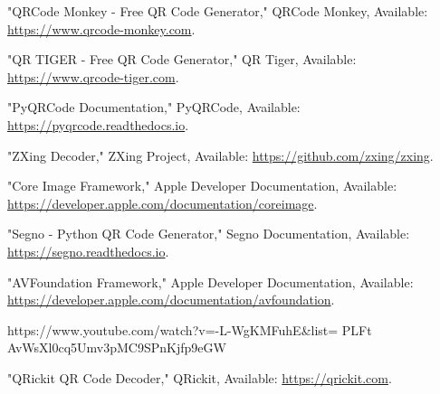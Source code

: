 \begin{thebibliography}{9}
	 "QRCode Monkey - Free QR Code Generator," QRCode Monkey, Available: \url{https://www.qrcode-monkey.com}.
	
	 "QR TIGER - Free QR Code Generator," QR Tiger, Available: \url{https://www.qrcode-tiger.com}.
	
	
	 "PyQRCode Documentation," PyQRCode, Available: \url{https://pyqrcode.readthedocs.io}.

	 "ZXing Decoder," ZXing Project, Available: \url{https://github.com/zxing/zxing}.

	 "Core Image Framework," Apple Developer Documentation, Available: \url{https://developer.apple.com/documentation/coreimage}.

	 "Segno - Python QR Code Generator," Segno Documentation, Available: \url{https://segno.readthedocs.io}.

	 "AVFoundation Framework," Apple Developer Documentation, Available: \url{https://developer.apple.com/documentation/avfoundation}.

	https://www.youtube.com/watch?v=-L-WgKMFuhE\&list=
	PLFt AvWsXl0cq5Umv3pMC9SPnKjfp9eGW

	 "QRickit QR Code Decoder," QRickit, Available: \url{https://qrickit.com}.
\end{thebibliography}